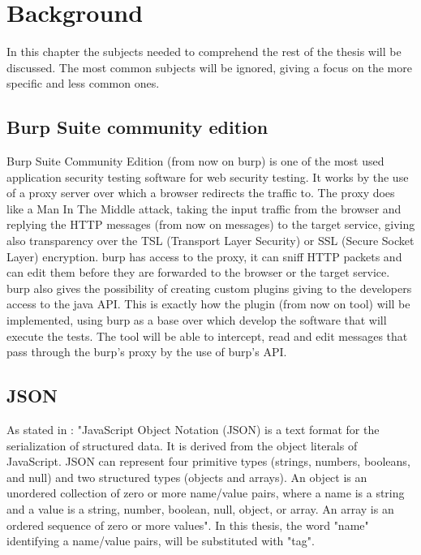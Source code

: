 \chapter{Background}
\label{chap:Background}
In this chapter the subjects needed to comprehend the rest of the thesis will be discussed. The most common subjects will be ignored, giving a focus on the more specific and less common ones.

\section{Burp Suite community edition}
Burp Suite Community Edition (from now on \Gls{burp}) is one of the most used application security testing software for web security testing. It works by the use of a proxy server over which a browser redirects the traffic to. The proxy does like a Man In The Middle attack, taking the input traffic from the browser and replying the HTTP messages (from now on messages) to the target service, giving also transparency over the TSL (Transport Layer Security) or SSL (Secure Socket Layer) encryption. \Gls{burp} has access to the proxy, it can sniff HTTP packets and can edit them before they are forwarded to the browser or the target service. \Gls{burp} also gives the possibility of creating custom plugins giving to the developers access to the java API. This is exactly how the plugin (from now on tool) will be implemented, using \Gls{burp} as a base over which develop the software that will execute the tests. The tool will be able to intercept, read and edit messages that pass through the \Gls{burp}'s proxy by the use of \Gls{burp}'s API.

\section{JSON}
As stated in \cite{json_standard}: "JavaScript Object Notation (JSON) is a text format for the serialization of structured data.  It is derived from the object literals of JavaScript. JSON can represent four primitive types (strings, numbers, booleans, and null) and two structured types (objects and arrays). An object is an unordered collection of zero or more name/value pairs, where a name is a string and a value is a string, number, boolean, null, object, or array. An array is an ordered sequence of zero or more values".
In this thesis, the word "name" identifying a name/value pairs, will be substituted with "tag".

